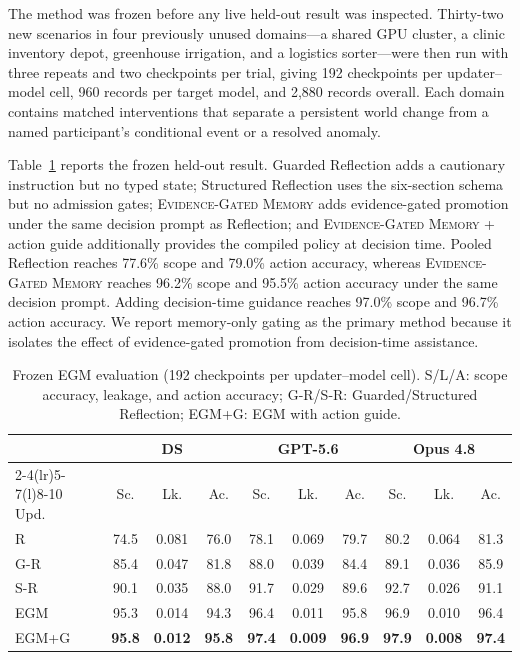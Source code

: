 \documentclass[sigconf,anonymous]{acmart}
\newcommand{\egm}{\textsc{Evidence-Gated Memory}}
\begin{document}
The method was frozen before any live held-out result was inspected. Thirty-two
new scenarios in four previously unused domains---a shared GPU cluster, a clinic
inventory depot, greenhouse irrigation, and a logistics sorter---were then run
with three repeats and two checkpoints per trial, giving 192 checkpoints per
updater--model cell, 960 records per target model, and 2{,}880 records overall.
Each domain contains matched interventions that separate a persistent world
change from a named participant's conditional event or a resolved anomaly.

Table~\ref{tab:heldout} reports the frozen held-out result. Guarded Reflection adds a cautionary
instruction but no typed state; Structured Reflection uses the six-section
schema but no admission gates; \egm{} adds evidence-gated promotion under the
same decision prompt as Reflection; and \egm{} + action guide additionally
provides the compiled policy at decision time. Pooled Reflection reaches 77.6\%
scope and 79.0\% action accuracy, whereas \egm{} reaches 96.2\% scope and
95.5\% action accuracy under the same decision prompt. Adding decision-time
guidance reaches 97.0\% scope and 96.7\% action accuracy. We report memory-only
gating as the primary method because it isolates the effect of evidence-gated
promotion from decision-time assistance.

\begin{table}[t]
  \caption{Frozen EGM evaluation (192 checkpoints per updater--model cell).
  S/L/A: scope accuracy, leakage, and action accuracy; G-R/S-R:
  Guarded/Structured Reflection; EGM+G: EGM with action guide.}
  \label{tab:heldout}
  \centering
  \footnotesize
  \setlength{\tabcolsep}{1.0pt}
  \begin{tabular*}{\columnwidth}{@{}l@{\extracolsep{\fill}}*{9}{c}@{}}
    \toprule
    & \multicolumn{3}{c}{DS}
    & \multicolumn{3}{c}{GPT-5.6}
    & \multicolumn{3}{c}{Opus 4.8} \\
    \cmidrule(lr){2-4}\cmidrule(lr){5-7}\cmidrule(l){8-10}
    Upd. & Sc. & Lk. & Ac. & Sc. & Lk. & Ac. & Sc. & Lk. & Ac. \\
    \midrule
    R     & 74.5 & 0.081 & 76.0
          & 78.1 & 0.069 & 79.7
          & 80.2 & 0.064 & 81.3 \\
    G-R   & 85.4 & 0.047 & 81.8
          & 88.0 & 0.039 & 84.4
          & 89.1 & 0.036 & 85.9 \\
    S-R   & 90.1 & 0.035 & 88.0
          & 91.7 & 0.029 & 89.6
          & 92.7 & 0.026 & 91.1 \\
    EGM   & 95.3 & 0.014 & 94.3
          & 96.4 & 0.011 & 95.8
          & 96.9 & 0.010 & 96.4 \\
    EGM+G & \textbf{95.8} & \textbf{0.012} & \textbf{95.8}
          & \textbf{97.4} & \textbf{0.009} & \textbf{96.9}
          & \textbf{97.9} & \textbf{0.008} & \textbf{97.4} \\
    \bottomrule
  \end{tabular*}
\end{table}
\end{document}
